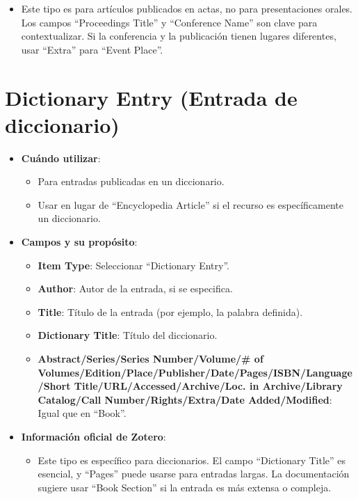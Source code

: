 \documentclass[
  jou,
  floatsintext,
  longtable,
  a4paper,
  nolmodern,
  notxfonts,
  notimes,
  12pt,
  colorlinks=true,linkcolor=blue,citecolor=blue,urlcolor=blue]{apa7}
\providecommand{\tightlist}{%
  \setlength{\itemsep}{0pt}\setlength{\parskip}{0pt}}
\begin{document}
\begin{itemize}
  \begin{itemize}
  \tightlist
  \item
    Este tipo es para artículos publicados en actas, no para
    presentaciones orales. Los campos ``Proceedings Title'' y
    ``Conference Name'' son clave para contextualizar. Si la conferencia
    y la publicación tienen lugares diferentes, usar ``Extra'' para
    ``Event Place''.
  \end{itemize}
\end{itemize}

\section{Dictionary Entry (Entrada de
diccionario)}\label{dictionary-entry-entrada-de-diccionario}

\begin{itemize}
\tightlist
\item
  \textbf{Cuándo utilizar}:

  \begin{itemize}
  \tightlist
  \item
    Para entradas publicadas en un diccionario.
  \item
    Usar en lugar de ``Encyclopedia Article'' si el recurso es
    específicamente un diccionario.
  \end{itemize}
\item
  \textbf{Campos y su propósito}:

  \begin{itemize}
  \tightlist
  \item
    \textbf{Item Type}: Seleccionar ``Dictionary Entry''.
  \item
    \textbf{Author}: Autor de la entrada, si se especifica.
  \item
    \textbf{Title}: Título de la entrada (por ejemplo, la palabra
    definida).
  \item
    \textbf{Dictionary Title}: Título del diccionario.
  \item
    \textbf{Abstract/Series/Series Number/Volume/\# of
    Volumes/Edition/Place/Publisher/Date/Pages/ISBN/Language/Short
    Title/URL/Accessed/Archive/Loc. in Archive/Library Catalog/Call
    Number/Rights/Extra/Date Added/Modified}: Igual que en ``Book''.
  \end{itemize}
\item
  \textbf{Información oficial de Zotero}:

  \begin{itemize}
  \tightlist
  \item
    Este tipo es específico para diccionarios. El campo ``Dictionary
    Title'' es esencial, y ``Pages'' puede usarse para entradas largas.
    La documentación sugiere usar ``Book Section'' si la entrada es más
    extensa o compleja.
  \end{itemize}
\end{itemize}
\end{document}
